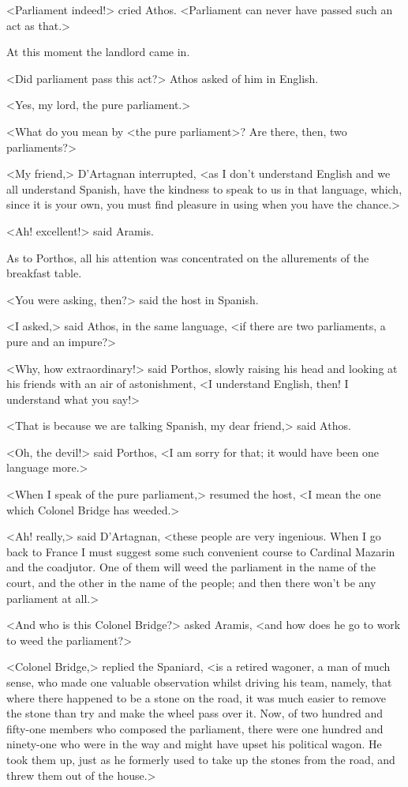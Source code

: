 <Parliament indeed!> cried Athos. <Parliament can never have passed such an act as that.>

At this moment the landlord came in.

<Did parliament pass this act?> Athos asked of him in English.

<Yes, my lord, the pure parliament.>

<What do you mean by <the pure parliament>? Are there, then, two parliaments?>

<My friend,> D'Artagnan interrupted, <as I don't understand English and we all understand Spanish, have the kindness to speak to us in that language, which, since it is your own, you must find pleasure in using when you have the chance.>

<Ah! excellent!> said Aramis.

As to Porthos, all his attention was concentrated on the allurements of the breakfast table.

<You were asking, then?> said the host in Spanish.

<I asked,> said Athos, in the same language, <if there are two parliaments, a pure and an impure?>

<Why, how extraordinary!> said Porthos, slowly raising his head and looking at his friends with an air of astonishment, <I understand English, then! I understand what you say!>

<That is because we are talking Spanish, my dear friend,> said Athos.

<Oh, the devil!> said Porthos, <I am sorry for that; it would have been one language more.>

<When I speak of the pure parliament,> resumed the host, <I mean the one which Colonel Bridge has weeded.>

<Ah! really,> said D'Artagnan, <these people are very ingenious. When I go back to France I must suggest some such convenient course to Cardinal Mazarin and the coadjutor. One of them will weed the parliament in the name of the court, and the other in the name of the people; and then there won't be any parliament at all.>

<And who is this Colonel Bridge?> asked Aramis, <and how does he go to work to weed the parliament?>

<Colonel Bridge,> replied the Spaniard, <is a retired wagoner, a man of much sense, who made one valuable observation whilst driving his team, namely, that where there happened to be a stone on the road, it was much easier to remove the stone than try and make the wheel pass over it. Now, of two hundred and fifty-one members who composed the parliament, there were one hundred and ninety-one who were in the way and might have upset his political wagon. He took them up, just as he formerly used to take up the stones from the road, and threw them out of the house.>

